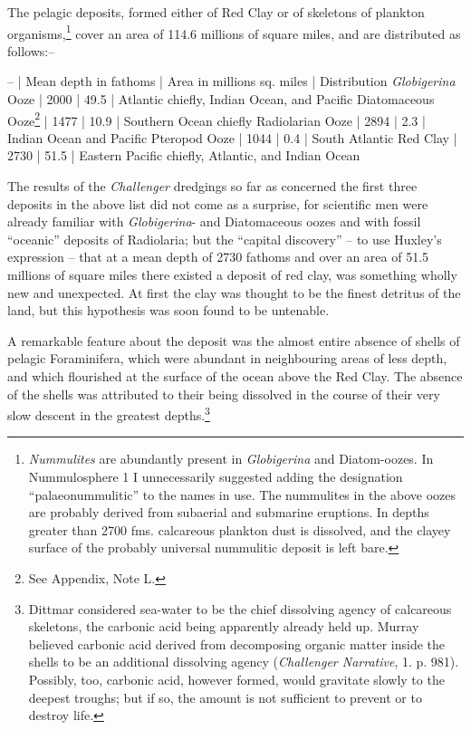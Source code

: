 \documentclass[a4paper, 12pt, oneside]{article}
\begin{document}
The pelagic deposits, formed either of Red Clay or of skeletons of plankton organisms,\footnote{\emph{Nummulites} are abundantly present in \emph{Globigerina} and Diatom-oozes. In Nummulosphere 1 I unnecessarily suggested adding the designation ``palaeonummulitic'' to the names in use. The nummulites in the above oozes are probably derived from subaerial and submarine eruptions. In depths greater than 2700 fms. calcareous plankton dust is dissolved, and the clayey surface of the probably universal nummulitic deposit is left bare.} cover an area of 114.6 millions of square miles, and are distributed as follows:--

-- | Mean depth in fathoms | Area in millions sq. miles | Distribution  
\emph{Globigerina} Ooze | 2000 | 49.5 | Atlantic chiefly, Indian Ocean, and Pacific  
Diatomaceous Ooze\footnote{See Appendix, Note L.} | 1477 | 10.9 | Southern Ocean chiefly  
Radiolarian Ooze | 2894 | 2.3 | Indian Ocean and Pacific  
Pteropod Ooze | 1044 | 0.4 | South Atlantic  
Red Clay | 2730 | 51.5 | Eastern Pacific chiefly, Atlantic, and Indian Ocean  

The results of the \emph{Challenger} dredgings so far as concerned the first three deposits in the above list did not come as a surprise, for scientific men were already familiar with \emph{Globigerina}- and Diatomaceous oozes and with fossil ``oceanic'' deposits of Radiolaria; but the ``capital discovery'' -- to use Huxley's expression -- that at a mean depth of 2730 fathoms and over an area of 51.5 millions of square miles there existed a deposit of red clay, was something wholly new and unexpected. At first the clay was thought to be the finest detritus of the land, but this hypothesis was soon found to be untenable.

A remarkable feature about the deposit was the almost entire absence of shells of pelagic Foraminifera, which were abundant in neighbouring areas of less depth, and which flourished at the surface of the ocean above the Red Clay. The absence of the shells was attributed to their being dissolved in the course of their very slow descent in the greatest depths.\footnote{Dittmar considered sea-water to be the chief dissolving agency of calcareous skeletons, the carbonic acid being apparently already held up. Murray believed carbonic acid derived from decomposing organic matter inside the shells to be an additional dissolving agency (\emph{Challenger Narrative}, 1. p. 981). Possibly, too, carbonic acid, however formed, would gravitate slowly to the deepest troughs; but if so, the amount is not sufficient to prevent or to destroy life.}
\end{document}

